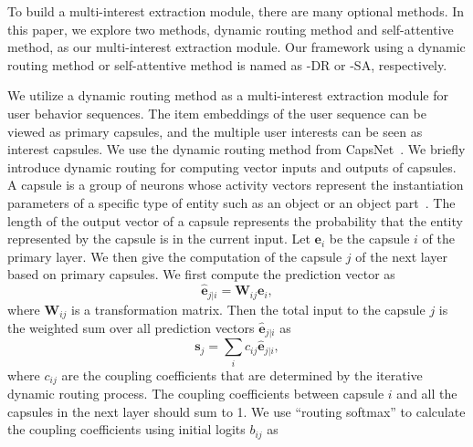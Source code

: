 
To build a multi-interest extraction module, there are many optional methods. In this paper, we explore two methods, dynamic routing method and self-attentive method, as our multi-interest extraction module. Our framework using a dynamic routing method or self-attentive method is named as \model-DR or \model-SA, respectively. 

We utilize a dynamic routing method as a multi-interest extraction module for user behavior sequences. The item embeddings of the user sequence can be viewed as primary capsules, and the multiple user interests can be seen as interest capsules. We use the dynamic routing method from CapsNet~\cite{sabour2017dynamic}. 
We briefly introduce dynamic routing for computing vector inputs and outputs of capsules. A capsule is a group of neurons whose activity vectors represent the instantiation parameters of a specific type of entity such as an object or an object part~\cite{sabour2017dynamic}. The length of the output vector of a capsule represents the probability that the entity represented by the capsule is in the current input. Let $\mathbf{e}_i$ be the capsule $i$ of the primary layer. We then give the computation of the capsule $j$ of the next layer based on primary capsules. 
We first compute the prediction vector as
\begin{equation}
    \hat{\mathbf{e}}_{j|i}=\mathbf{W}_{ij} \mathbf{e}_{i},
\end{equation}
where $\mathbf{W}_{ij}$ is a transformation matrix. Then the total input to the capsule $j$ is the weighted sum over all prediction vectors $\hat{\mathbf{e}}_{j|i}$ as
\begin{equation}
        \mathbf{s}_j = \sum_i c_{ij} \hat{\mathbf{e}}_{j|i},
\end{equation}
where $c_{ij}$ are the coupling coefficients that are determined by the iterative dynamic routing process. The coupling coefficients between capsule $i$ and all the capsules in the next layer should sum to 1. We use ``routing softmax'' to calculate the coupling coefficients using initial logits $b_{ij}$ as

